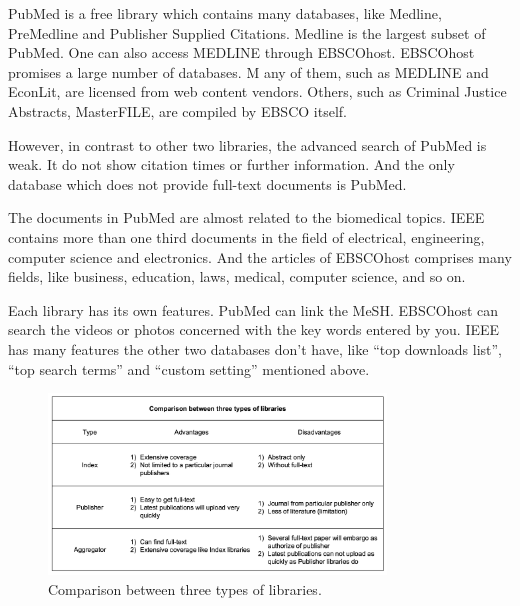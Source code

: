 \begin{enumerate}
	PubMed is a free library which contains many databases, like Medline, PreMedline and Publisher Supplied Citations.
    Medline is the largest subset of PubMed.
    One can also access MEDLINE through EBSCOhost.  
    EBSCOhost promises a large number of databases. M
	any of them, such as MEDLINE and EconLit, are licensed from web content vendors.
    Others, such as Criminal Justice Abstracts, MasterFILE, are compiled by EBSCO itself.

    However, in contrast to other two libraries, the advanced search of PubMed is weak. 
    It do not show citation times or further information.
    And the only database which does not provide full-text documents is PubMed. 

    The documents in PubMed are almost related to the biomedical topics.
    IEEE contains more than one third documents in the field of electrical, engineering, computer science and electronics.
    And the articles of EBSCOhost comprises many fields, like business, education, laws, medical, computer science, and so on.

    Each library has its own features. PubMed can link the MeSH. EBSCOhost can search the videos or photos concerned with the key words entered by you. 
    IEEE has many features the other two databases don’t have, like “top downloads list”, “top search terms” and “custom setting” mentioned above.

    

\end{enumerate}


\begin{figure}[htb]
	\begin{center}
		\includegraphics[width=0.8\textwidth]{Wolverine_Background_Chart_1}
	\end{center}
	\caption{Comparison between three types of libraries.\label{WBC1}}
\end{figure}
\newpage
